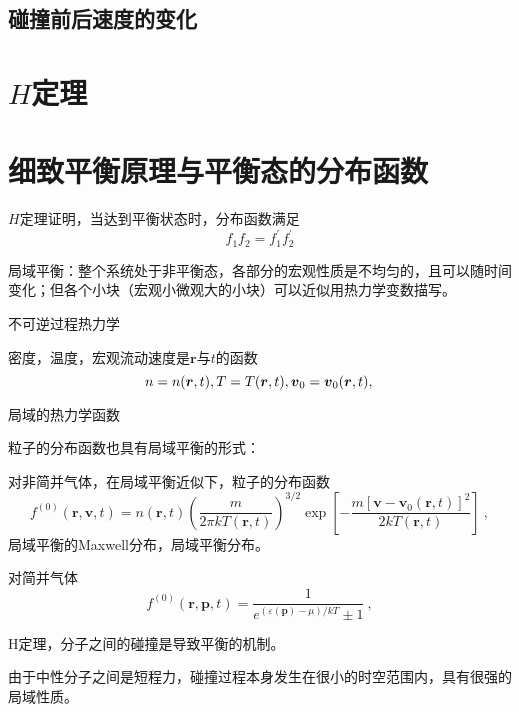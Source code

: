 \documentclass[12pt,a4paper]{article}
\renewcommand{\vec}[1]{\boldsymbol{#1}}
\begin{document}
\subsection{碰撞前后速度的变化}






\section{$H$定理}



\section{细致平衡原理与平衡态的分布函数}
$H$定理证明，当达到平衡状态时，分布函数满足
\begin{equation}
f_1 f_2 = f_1^\prime f_2^\prime
\end{equation}


局域平衡：整个系统处于非平衡态，各部分的宏观性质是不均匀的，且可以随时间变化；但各个小块（宏观小微观大的小块）可以近似用热力学变数描写。

不可逆过程热力学

密度，温度，宏观流动速度是$\vec{r}$与$t$的函数
\begin{equation}
n = n(\vec{r}, t), \\
T = T(\vec{r}, t), \\
\vec{v}_0 = \vec{v}_0(\vec{r}, t), \\
\end{equation}


局域的热力学函数

粒子的分布函数也具有局域平衡的形式：

对非简并气体，在局域平衡近似下，粒子的分布函数
\begin{equation}
f^{(0)}(\vec{r}, \vec{v}, t) = n(\vec{r}, t) \left(\frac{m}{2\pi k T(\vec{r}, t)} \right)^{3/2} \exp \left[-\frac{m[\vec{v} -\vec{v}_0(\vec{r}, t)]^2}{2k T(\vec{r}, t)} \right] ~,
\end{equation}
局域平衡的Maxwell分布，局域平衡分布。

对简并气体
\begin{equation}
f^{(0)}(\vec{r}, \vec{p}, t) = \frac{1}{e^{(\varepsilon(\vec{p})-\mu)/kT} \pm 1} ~,
\end{equation}


H定理，分子之间的碰撞是导致平衡的机制。

由于中性分子之间是短程力，碰撞过程本身发生在很小的时空范围内，具有很强的局域性质。
\end{document}
